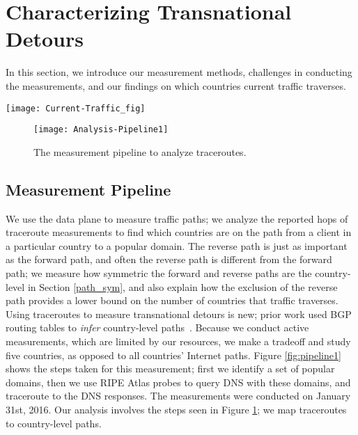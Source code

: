 \section{Characterizing Transnational Detours}
\label{datasets}
In this section, we introduce our measurement methods, challenges in conducting the measurements, and our findings on which countries current traffic traverses.

\begin{figure*}[t]
\centering
\texttt{[image: Current-Traffic\_fig]}
\caption{The measurement pipeline to study current traffic routes.}
\label{fig:pipeline1}
\end{figure*}

\begin{figure}[t]
\centering
\texttt{[image: Analysis-Pipeline1]}
\caption{The measurement pipeline to analyze traceroutes.}
\label{fig:analysis_pipeline}
\end{figure}

\subsection{Measurement Pipeline}
\label{pipeline}
We use the data plane to measure traffic paths; we analyze the reported hops of traceroute measurements to find which countries are on the path from a client in a particular country to a popular domain.  The reverse path is just as important as the forward path, and often the reverse path is different from the forward path; we measure how symmetric the forward and reverse paths are the country-level in Section \ref{path_sym}, and also explain how the exclusion of the reverse path provides a lower bound on the number of countries that traffic traverses.  Using traceroutes to measure transnational detours is new; prior work used BGP routing tables to \textit{infer} country-level paths~\cite{karlin2009nation}.  Because we conduct active measurements, which are limited by our resources, we make a tradeoff and study five countries, as opposed to all countries' Internet paths.  Figure \ref{fig:pipeline1} shows the steps taken for this measurement; first we identify a set of popular domains, then we use RIPE Atlas probes to query DNS with these domains, and traceroute to the DNS responses.  The measurements were conducted on January 31st, 2016.  Our analysis involves the steps seen in Figure \ref{fig:analysis_pipeline}; we map traceroutes to country-level paths.

